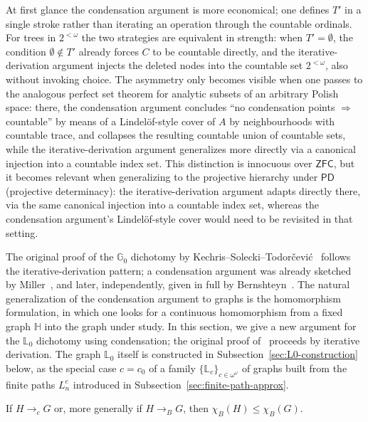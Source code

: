 \medskip
At first glance the condensation argument is more economical; one defines $T'$ in a single stroke rather than iterating an operation through the countable ordinals.
For trees in $2^{<\omega}$ the two strategies are equivalent in strength: when $T' = \emptyset$, the condition $\emptyset \notin T'$ already forces $C$ to be countable directly, and the iterative-derivation argument injects the deleted nodes into the countable set $2^{<\omega}$, also without invoking choice.
The asymmetry only becomes visible when one passes to the analogous perfect set theorem for analytic subsets of an arbitrary Polish space: there, the condensation argument concludes ``no condensation points $\Rightarrow$ countable'' by means of a Lindel\"of-style cover of $A$ by neighbourhoods with countable trace, and collapses the resulting countable union of countable sets, while the iterative-derivation argument generalizes more directly via a canonical injection into a countable index set.
This distinction is innocuous over $\mathsf{ZFC}$, but it becomes relevant when generalizing to the projective hierarchy under $\mathsf{PD}$ (projective determinacy): the iterative-derivation argument adapts directly there, via the same canonical injection into a countable index set, whereas the condensation argument's Lindel\"of-style cover would need to be revisited in that setting.

The original proof of the $\mathbb{G}_0$ dichotomy by Kechris--Solecki--Todor\v{c}evi\'c~\cite{kechris1999borel} follows the iterative-derivation pattern; a condensation argument was already sketched by Miller~\cite{Miller2012}, and later, independently, given in full by Bernshteyn~\cite{Bernshteyn2024}.
The natural generalization of the condensation argument to graphs is the homomorphism formulation, in which one looks for a continuous homomorphism from a fixed graph $\mathbb{H}$ into the graph under study.
In this section, we give a new argument for the $\mathbb{L}_0$ dichotomy using condensation; the original proof of~\cite{L0paper} proceeds by iterative derivation.
The graph $\mathbb{L}_0$ itself is constructed in Subsection~\ref{sec:L0-construction} below, as the special case $c=c_0$ of a family $\{\mathbb{L}_c\}_{c\in\omega^\omega}$ of graphs built from the finite paths $L^c_n$ introduced in Subsection~\ref{sec:finite-path-approx}.

\begin{fact}\label{fact:chrom_transitive}
    If $H\to_cG$ or, more generally if $H\to_BG$, then $\chi_B(H)\leq\chi_B(G)$.
\end{fact}

